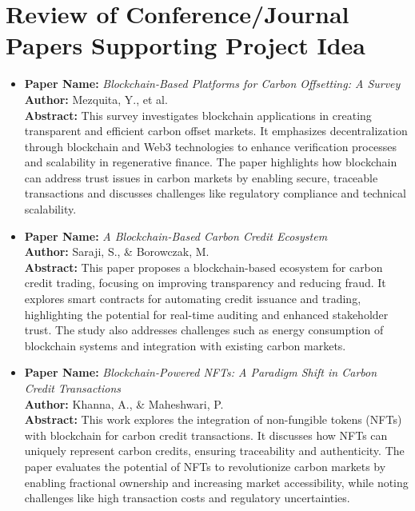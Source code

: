 \documentclass[oneside,a4paper,12pt]{book}
\begin{document}
\section{Review of Conference/Journal Papers Supporting Project Idea}
\label{sec:survey}
\begin{itemize}
  \item \textbf{Paper Name:} \textit{Blockchain-Based Platforms for Carbon Offsetting: A Survey} \\
        \textbf{Author:} Mezquita, Y., et al. \\
        \textbf{Abstract:} This survey investigates blockchain applications in creating transparent and efficient carbon offset markets. It emphasizes decentralization through blockchain and Web3 technologies to enhance verification processes and scalability in regenerative finance. The paper highlights how blockchain can address trust issues in carbon markets by enabling secure, traceable transactions and discusses challenges like regulatory compliance and technical scalability.

  \item \textbf{Paper Name:} \textit{A Blockchain-Based Carbon Credit Ecosystem} \\
        \textbf{Author:} Saraji, S., \& Borowczak, M. \\
        \textbf{Abstract:} This paper proposes a blockchain-based ecosystem for carbon credit trading, focusing on improving transparency and reducing fraud. It explores smart contracts for automating credit issuance and trading, highlighting the potential for real-time auditing and enhanced stakeholder trust. The study also addresses challenges such as energy consumption of blockchain systems and integration with existing carbon markets.

  \item \textbf{Paper Name:} \textit{Blockchain-Powered NFTs: A Paradigm Shift in Carbon Credit Transactions} \\
        \textbf{Author:} Khanna, A., \& Maheshwari, P. \\
        \textbf{Abstract:} This work explores the integration of non-fungible tokens (NFTs) with blockchain for carbon credit transactions. It discusses how NFTs can uniquely represent carbon credits, ensuring traceability and authenticity. The paper evaluates the potential of NFTs to revolutionize carbon markets by enabling fractional ownership and increasing market accessibility, while noting challenges like high transaction costs and regulatory uncertainties.


\end{itemize}
\end{document}
